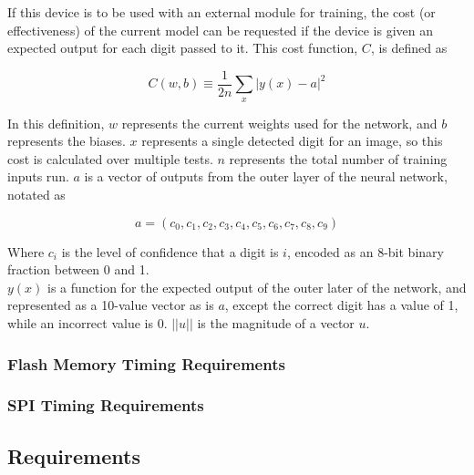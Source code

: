 \documentclass[12pt]{article}
\begin{document}
If this device is to be used with an external module for training, the cost (or effectiveness) of the current model can be requested if the device is given an expected output for each digit passed to it. This cost function, $C$, is defined as

\begin{equation} \label{eq:cost}
C(w,b) \equiv \frac{1}{2n}\sum_x |y(x) - a|^2
\end{equation}

In this definition, $w$ represents the current weights used for the network, and $b$ represents the biases. $x$ represents a single detected digit for an image, so this cost is calculated over multiple tests. $n$ represents the total number of training inputs run. $a$ is a vector of outputs from the outer layer of the neural network, notated as

\begin{equation}\label{eq:output-vector}
a = (c_0,c_1,c_2,c_3,c_4,c_5,c_6,c_7,c_8,c_9)
\end{equation}

Where $c_i$ is the level of confidence that a digit is $i$, encoded as an 8-bit binary fraction between 0 and 1.\\

$y(x)$ is a function for the expected output of the outer later of the network, and represented as a 10-value vector as is $a$, except the correct digit has a value of 1, while an incorrect value is 0. $||u||$ is the magnitude of a vector $u$.

\subsubsection{Flash Memory Timing Requirements}

\subsubsection{SPI Timing Requirements}


\subsection{Requirements}
\end{document}
